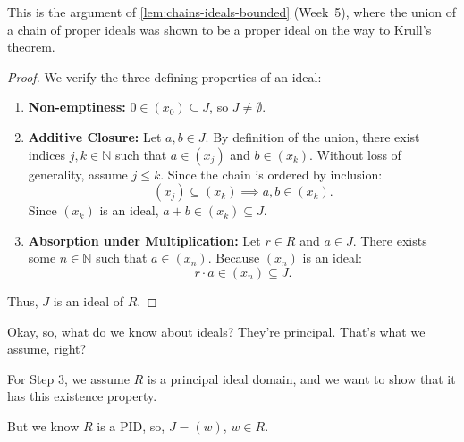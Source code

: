 \begin{proofWrapper}
\begin{content}

This is the argument of \cref{lem:chains-ideals-bounded} (Week~5), where the union of a chain of proper ideals was shown to be a proper ideal on the way to Krull's theorem.

\begin{proof}
We verify the three defining properties of an ideal:
\begin{enumerate}[label=\textbf{(\arabic*)}]
    \item \textbf{Non-emptiness:} $0 \in (x_0) \subseteq J$, so $J \neq \emptyset$.
    \item \textbf{Additive Closure:} Let $a, b \in J$. By definition of the union, there exist indices $j, k \in \mathbb{N}$ such that $a \in (x_j)$ and $b \in (x_k)$. Without loss of generality, assume $j \le k$. Since the chain is ordered by inclusion:
    \[
    (x_j) \subseteq (x_k) \implies a, b \in (x_k).
    \]
    Since $(x_k)$ is an ideal, $a + b \in (x_k) \subseteq J$.
    \item \textbf{Absorption under Multiplication:} Let $r \in R$ and $a \in J$. There exists some $n \in \mathbb{N}$ such that $a \in (x_n)$. Because $(x_n)$ is an ideal:
    \[
    r \cdot a \in (x_n) \subseteq J.
    \]
\end{enumerate}
Thus, $J$ is an ideal of $R$.
\end{proof}
\end{content}

\begin{hidden}
\end{hidden}

\begin{speech}[01:12:09 - 01:14:44]
Okay, so, what do we know about ideals? They're principal. That's what we assume, right?

For Step 3, we assume $R$ is a principal ideal domain, and we want to show that it has this existence property.

But we know $R$ is a PID, so, $J = (w)$, $w \in R$. 


\end{speech}
\end{proofWrapper}
